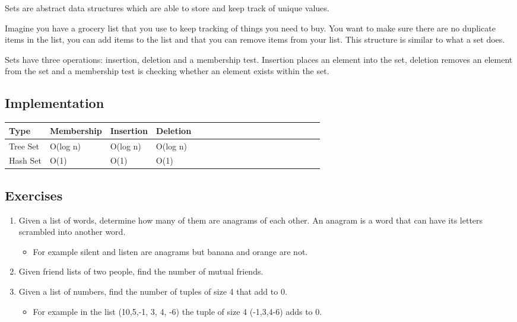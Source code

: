 \documentclass[11pt,oneside]{book}
\begin{document}
Sets are abstract data structures which are able to store and keep track of unique values.

Imagine you have a grocery list that you use to keep tracking of things you need to buy. You want to make sure there are no duplicate items in the list, you can add items to the list and that you can remove items from your list. This structure is similar to what a set does.

Sets have three operations: insertion, deletion and a membership test. Insertion places an element into the set, deletion removes an element from the set and a membership test is checking whether an element exists within the set.

\subsection{Implementation}

\vspace{10px}\begin{tabulary}{0.4\linewidth}{|l|l|l|l|l|l|l|l|l|l|l|l|l|l|l|l|l|l|l}\hline


  Type &
  Membership &
  Insertion &
  Deletion\\
\hline


  Tree Set &
  O(log n) &
  O(log n) &
  O(log n)\\

  Hash Set &
  O(1) &
  O(1) &
  O(1)\\

\hline\end{tabulary}

\subsection{Exercises}

\begin{enumerate}
\item Given a list of words, determine how many of them are anagrams of each other. An anagram is a word that can have its letters scrambled into another word. 

\begin{itemize}
\item For example silent and listen are anagrams but banana and orange are not.
\end{itemize}
\item Given friend lists of two people, find the number of mutual friends.
\item Given a list of numbers, find the number of tuples of size 4 that add to 0. 

\begin{itemize}
\item For example in the list (10,5,-1, 3, 4, -6) the tuple of size 4 (-1,3,4-6) adds to 0.
\end{itemize}
\end{enumerate}
\end{document}
